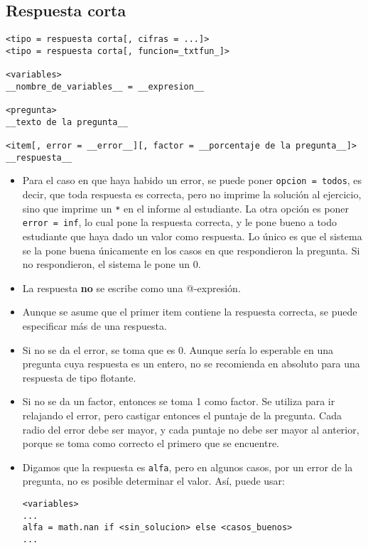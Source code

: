 \documentclass[12pt]{article}
\theoremstyle{definition}
\begin{document}
\subsection{Respuesta corta}

\small
\begin{verbatim}
<tipo = respuesta corta[, cifras = ...]>
<tipo = respuesta corta[, funcion=_txtfun_]>

<variables>
__nombre_de_variables__ = __expresion__

<pregunta>
__texto de la pregunta__

<item[, error = __error__][, factor = __porcentaje de la pregunta__]>
__respuesta__
\end{verbatim}
\normalsize

\begin{itemize}
  \item Para el caso en que haya habido un error, se puede poner \verb|opcion = todos|, es decir, que toda respuesta es correcta, pero no imprime la solución al ejercicio, sino que imprime un \verb|*| en el informe al estudiante. La otra opción es poner \verb|error = inf|, lo cual pone la respuesta correcta, y le pone bueno a todo estudiante que haya dado un valor como respuesta. Lo \'unico es que el sistema se la pone buena \'unicamente en los casos en que respondieron la pregunta. Si no respondieron, el sistema le pone un 0.
  \item La respuesta \textbf{no} se escribe como una @-expresión.
  \item Aunque se asume que el primer item contiene la respuesta correcta, se puede especificar más de una respuesta.  
  \item Si no se da el error, se toma que es 0. Aunque sería lo esperable en una pregunta cuya respuesta es un entero, no se recomienda en absoluto para una respuesta de tipo flotante. 
  \item Si no se da un factor, entonces se toma 1 como factor. Se utiliza para ir relajando el error, pero castigar entonces el puntaje de la pregunta. Cada radio del error debe ser mayor, y cada puntaje no debe ser mayor al anterior, porque se toma como correcto el primero que se encuentre.
  \item Digamos que la respuesta es \verb|alfa|, pero en algunos casos, por un error de la pregunta, no es posible determinar el valor. As\'i, puede usar:
\begin{verbatim}
<variables>
...
alfa = math.nan if <sin_solucion> else <casos_buenos>
...


\end{verbatim}
\end{itemize}
\end{document}
